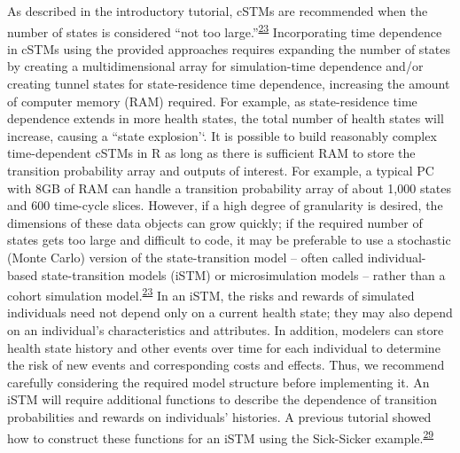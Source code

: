 \documentclass[
]{article}
\begin{document}
As described in the introductory tutorial, cSTMs are recommended when the number of states is considered ``not too large.''\textsuperscript{\protect\hyperlink{ref-Siebert2012c}{23}} Incorporating time dependence in cSTMs using the provided approaches requires expanding the number of states by creating a multidimensional array for simulation-time dependence and/or creating tunnel states for state-residence time dependence, increasing the amount of computer memory (RAM) required. For example, as state-residence time dependence extends in more health states, the total number of health states will increase, causing a ``state explosion'`. It is possible to build reasonably complex time-dependent cSTMs in R as long as there is sufficient RAM to store the transition probability array and outputs of interest. For example, a typical PC with 8GB of RAM can handle a transition probability array of about 1,000 states and 600 time-cycle slices. However, if a high degree of granularity is desired, the dimensions of these data objects can grow quickly; if the required number of states gets too large and difficult to code, it may be preferable to use a stochastic (Monte Carlo) version of the state-transition model -- often called individual-based state-transition models (iSTM) or microsimulation models -- rather than a cohort simulation model.\textsuperscript{\protect\hyperlink{ref-Siebert2012c}{23}} In an iSTM, the risks and rewards of simulated individuals need not depend only on a current health state; they may also depend on an individual's characteristics and attributes. In addition, modelers can store health state history and other events over time for each individual to determine the risk of new events and corresponding costs and effects. Thus, we recommend carefully considering the required model structure before implementing it. An iSTM will require additional functions to describe the dependence of transition probabilities and rewards on individuals' histories. A previous tutorial showed how to construct these functions for an iSTM using the Sick-Sicker example.\textsuperscript{\protect\hyperlink{ref-Krijkamp2018}{29}}
\end{document}

